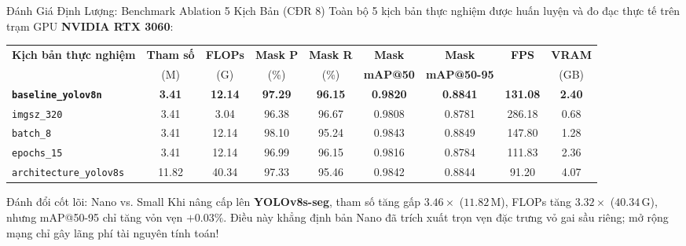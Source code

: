 \documentclass[aspectratio=169, 10pt]{beamer}
\begin{document}
\begin{frame}{Đánh Giá Định Lượng: Benchmark Ablation 5 Kịch Bản (CĐR 8)}
\scriptsize
Toàn bộ 5 kịch bản thực nghiệm được huấn luyện và đo đạc thực tế trên trạm GPU \textbf{NVIDIA RTX 3060}:
\vspace{0.1cm}
\begin{table}[htbp]
\centering
\scriptsize
\renewcommand{\arraystretch}{0.95}
\begin{tabular}{l c c c c c c c c}
\toprule
\textbf{Kịch bản thực nghiệm} & \textbf{Tham số} & \textbf{FLOPs} & \textbf{Mask P} & \textbf{Mask R} & \textbf{Mask} & \textbf{Mask} & \textbf{FPS} & \textbf{VRAM} \\
 & (M) & (G) & (\%) & (\%) & \textbf{mAP@50} & \textbf{mAP@50-95} & & (GB) \\
\midrule
\rowcolor{bkblue!15} \textbf{\texttt{baseline\_yolov8n}} & \textbf{3.41} & \textbf{12.14} & \textbf{97.29} & \textbf{96.15} & \textbf{0.9820} & \textbf{0.8841} & \textbf{131.08} & \textbf{2.40} \\
\texttt{imgsz\_320}        & 3.41 & 3.04  & 96.38 & 96.67 & 0.9808 & 0.8781 & 286.18 & 0.68 \\
\texttt{batch\_8}          & 3.41 & 12.14 & 98.10 & 95.24 & 0.9843 & 0.8849 & 147.80 & 1.28 \\
\texttt{epochs\_15}        & 3.41 & 12.14 & 96.99 & 96.15 & 0.9816 & 0.8784 & 111.83 & 2.36 \\
\texttt{architecture\_yolov8s} & 11.82 & 40.34 & 97.33 & 95.46 & 0.9842 & 0.8844 & 91.20 & 4.07 \\
\bottomrule
\end{tabular}
\end{table}

\begin{alertblock}{Đánh đổi cốt lõi: Nano vs. Small}
\scriptsize
Khi nâng cấp lên \textbf{YOLOv8s-seg}, tham số tăng gấp $3.46\times$ ($11.82\,\text{M}$), FLOPs tăng $3.32\times$ ($40.34\,\text{G}$), nhưng mAP@50-95 chỉ tăng vỏn vẹn \textbf{$+0.03\%$}. Điều này khẳng định bản Nano đã trích xuất trọn vẹn đặc trưng vỏ gai sầu riêng; mở rộng mạng chỉ gây lãng phí tài nguyên tính toán!
\end{alertblock}
\end{frame}
\end{document}
